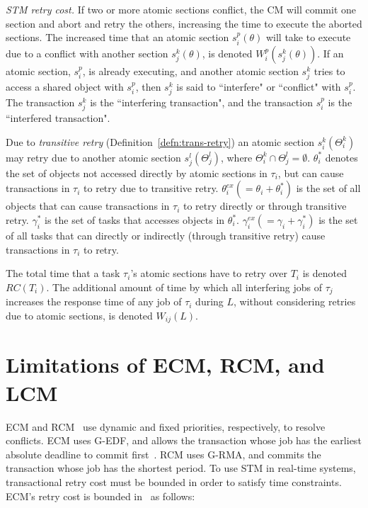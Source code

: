 \documentclass[twocolumn]{article}
\begin{document}
\textit{STM retry cost.} If two or more atomic sections conflict, the CM will commit one section and abort and retry the others, increasing the time to execute the aborted sections. The increased time that an atomic section $s_i^p (\theta)$ will take to execute due to a conflict with another section $s_j^k (\theta)$, is denoted $W_{i}^{p}(s_{j}^{k}(\theta))$. If an atomic section, $s_i^p$, is already executing, and another atomic section $s_j^k$ tries to access a shared object with $s_i^p$, then $s_j^k$ is said to ``interfere" or ``conflict" with $s_i^p$. The transaction $s_j^k$ is the ``interfering transaction", and the transaction $s_i^p$ is the ``interfered transaction".

Due to \textit{transitive retry} 
(Definition~\ref{defn:trans-retry}) 
an atomic section $s_i^k(\Theta_i^k)$ may retry due to another atomic section $s_j^l(\Theta_j^l)$, where $\Theta_i^k \cap \Theta_j^l = \emptyset$. $\theta_i^*$ denotes the set of objects not accessed directly by atomic sections in $\tau_i$, but can cause transactions in $\tau_i$ to retry due to transitive retry. $\theta_i^{ex}(=\theta_i + \theta_i^*)$ is the set of all objects that can cause transactions in $\tau_i$ to retry directly or through transitive retry. $\gamma_i^*$ is the set of tasks that accesses  objects in $\theta_i^*$. $\gamma_i^{ex}(=\gamma_i + \gamma_i^*)$ is the set of all tasks that can directly or indirectly (through transitive retry) cause transactions in $\tau_i$ to retry.

The total time that a task $\tau_i$'s atomic sections have to retry over $T_i$ is denoted $RC(T_i)$. The additional amount of time by which all interfering jobs of $\tau_j$ increases the response time of any job of $\tau_i$ during $L$, without considering retries due to atomic sections, is denoted $W_{ij}(L)$.

\section{Limitations of ECM, RCM, and LCM}\label{probelm description}

ECM and RCM~\cite{stmconcurrencycontrol:emsoft11} use dynamic and fixed priorities, respectively, to resolve conflicts. ECM uses G-EDF, and allows the transaction whose job has the earliest absolute deadline to commit first~\cite{6045438}. RCM uses G-RMA, and commits the transaction whose job has the shortest period.
 To use STM in real-time systems, transactional retry cost must be bounded in order to satisfy time constraints.
  ECM's retry cost is bounded in~\cite{stmconcurrencycontrol:emsoft11} as follows:
\end{document}
